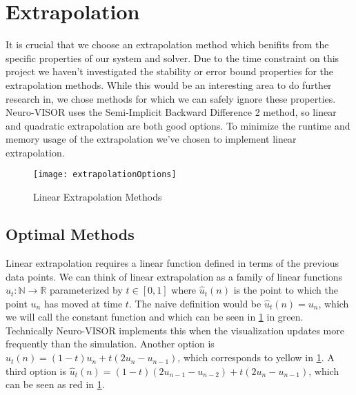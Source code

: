 
\section{Extrapolation}%
\label{sec:extrapolation}

It is crucial that we choose an extrapolation method which benifits from the specific properties of our system and solver.
Due to the time constraint on this project we haven't investigated the stability or error bound properties for the extrapolation methods.
While this would be an interesting area to do further research in, we chose methods for which we can safely ignore these properties.
Neuro-VISOR uses the Semi-Implicit Backward Difference 2 method\cite{neuroVISOR}, so linear and quadratic extrapolation are both good options.
To minimize the runtime and memory usage of the extrapolation we've chosen to implement linear extrapolation.

\begin{figure}[H]
    \centering
    \texttt{[image: extrapolationOptions]}
    \caption{Linear Extrapolation Methods}%
    \label{fig:extrapMethods}
\end{figure}

\subsection{Optimal Methods}%
\label{sub:optimal_methods}

Linear extrapolation requires a linear function defined in terms of the previous data points.
We can think of linear extrapolation as a family of linear functions $\hat{u}_t : \mathbb{N} \to \mathbb{R}$ parameterized by $t \in [0,1]$ where $\hat{u}_t(n)$ is the point to which the point $u_n$ has moved at time $t$.
The naive definition would be $\hat{u}_t(n) = u_n$, which we will call the constant function and which can be seen in \cref{fig:extrapMethods} in green.
Technically Neuro-VISOR implements this when the visualization updates more frequently than the simulation.
Another option is $\hat{u}_t(n) = (1-t)u_n + t(2u_n - u_{n-1})$, which corresponds to yellow in \cref{fig:extrapMethods}.
A third option is $\hat{u}_t(n) = (1-t)(2u_{n-1} - u_{n-2}) + t(2u_n - u_{n-1})$, which can be seen as red in \cref{fig:extrapMethods}.


